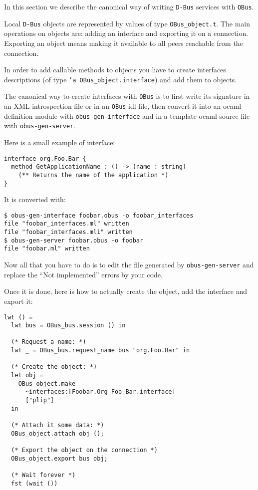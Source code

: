 \documentclass{article}
\newcommand{\obus}{\texttt{OBus}\xspace}
\newcommand{\dbus}{\texttt{D-Bus}\xspace}
\begin{document}
In this section we describe the canonical way of writing \dbus
services with \obus.

Local \dbus objects are represented by values of type
\texttt{OBus\_object.t}. The main operations on objects are: adding an
interface and exporting it on a connection.  Exporting an object means
making it available to all peers reachable from the connection.

In order to add callable methods to objects you have to create
interfaces descriptions (of type \texttt{'a OBus\_object.interface})
and add them to objects.

The canonical way to create interfaces with \obus is to first write
its signature in an XML introspection file or in an \obus idl file,
then convert it into an ocaml definition module with
\texttt{obus-gen-interface} and in a template ocaml source file with
\texttt{obus-gen-server}.

Here is a small example of interface:

\lstset{language=[Objective]Caml}
\begin{lstlisting}
interface org.Foo.Bar {
  method GetApplicationName : () -> (name : string)
    (** Returns the name of the application *)
}
\end{lstlisting}

It is converted with:

\lstset{language=bash}
\begin{lstlisting}
$ obus-gen-interface foobar.obus -o foobar_interfaces
file "foobar_interfaces.ml" written
file "foobar_interfaces.mli" written
$ obus-gen-server foobar.obus -o foobar
file "foobar.ml" written
\end{lstlisting}

Now all that you have to do is to edit the file generated by
\texttt{obus-gen-server} and replace the ``Not implemented'' errors by
your code.

Once it is done, here is how to actually create the object, add the
interface and export it:

\lstset{language=[Objective]Caml}
\begin{lstlisting}
lwt () =
  lwt bus = OBus_bus.session () in

  (* Request a name: *)
  lwt _ = OBus_bus.request_name bus "org.Foo.Bar" in

  (* Create the object: *)
  let obj =
    OBus_object.make
      ~interfaces:[Foobar.Org_Foo_Bar.interface]
      ["plip"]
  in

  (* Attach it some data: *)
  OBus_object.attach obj ();

  (* Export the object on the connection *)
  OBus_object.export bus obj;

  (* Wait forever *)
  fst (wait ())
\end{lstlisting}
\end{document}
